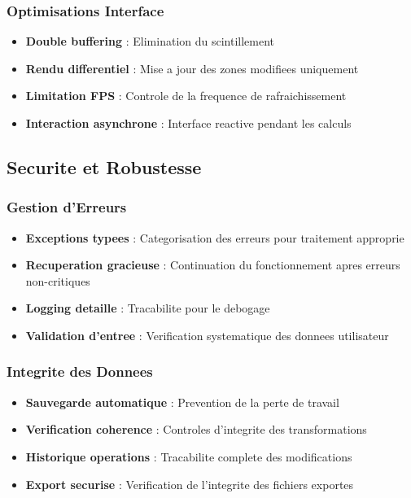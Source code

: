 \documentclass[12pt,a4paper]{article}
\begin{document}
\subsubsection{Optimisations Interface}

\begin{itemize}
\item \textbf{Double buffering} : Elimination du scintillement
\item \textbf{Rendu differentiel} : Mise a jour des zones modifiees uniquement
\item \textbf{Limitation FPS} : Controle de la frequence de rafraichissement
\item \textbf{Interaction asynchrone} : Interface reactive pendant les calculs
\end{itemize}

\subsection{Securite et Robustesse}

\subsubsection{Gestion d'Erreurs}

\begin{itemize}
\item \textbf{Exceptions typees} : Categorisation des erreurs pour traitement approprie
\item \textbf{Recuperation gracieuse} : Continuation du fonctionnement apres erreurs non-critiques
\item \textbf{Logging detaille} : Tracabilite pour le debogage
\item \textbf{Validation d'entree} : Verification systematique des donnees utilisateur
\end{itemize}

\subsubsection{Integrite des Donnees}

\begin{itemize}
\item \textbf{Sauvegarde automatique} : Prevention de la perte de travail
\item \textbf{Verification coherence} : Controles d'integrite des transformations
\item \textbf{Historique operations} : Tracabilite complete des modifications
\item \textbf{Export securise} : Verification de l'integrite des fichiers exportes
\end{itemize}
\end{document}
